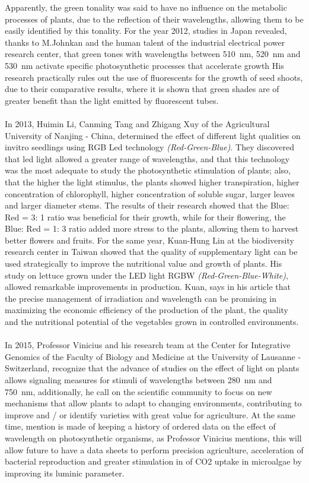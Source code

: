 \documentclass[letterpaper,12pt,twoside]{articleingud}
\begin{document}
Apparently, the green tonality was said to have no influence on the metabolic processes of plants, due to the reflection of their wavelengths, allowing them to be easily identified by this tonality. For the year 2012, studies in Japan revealed, thanks to M.Johnkan and the human talent of the industrial electrical power research center, that green tones with wavelengths between \SI{510}{\nano\metre}, \SI{520}{\nano\metre} and \SI{530}{\nano\metre} activate specific photosynthetic processes that accelerate growth His research practically rules out the use of fluorescents for the growth of seed shoots, due to their comparative results, where it is shown that green shades are of greater benefit than the light emitted by fluorescent tubes.\cite{Johkan}\\\\
In 2013, Huimin Li, Canming Tang and Zhigang Xuy of the Agricultural University of Nanjing - China, determined the effect of different light qualities on invitro seedlings using RGB Led technology \textit{(Red-Green-Blue)}. They discovered that led light allowed a greater range of wavelengths, and that this technology was the most adequate to study the photosynthetic stimulation of plants; also, that the higher the light stimulus, the plants showed higher transpiration, higher concentration of chlorophyll, higher concentration of soluble sugar, larger leaves and larger diameter stems. The results of their research showed that the Blue: Red = 3: 1 ratio was beneficial for their growth, while for their flowering, the Blue: Red = 1: 3 ratio added more stress to the plants, allowing them to harvest better flowers and fruits.\cite{Li}
For the same year, Kuan-Hung Lin at the biodiversity research center in Taiwan showed that the quality of supplementary light can be used strategically to improve the nutritional value and growth of plants. His study on lettuce grown under the LED light RGBW \textit{(Red-Green-Blue-White)}, allowed remarkable improvements in production. Kuan, says in his article that the precise management of irradiation and wavelength can be promising in maximizing the economic efficiency of the production of the plant, the quality and the nutritional potential of the vegetables grown in controlled environments.\cite{Kuan}\\\\
In 2015, Professor Vinicius and his research team at the Center for Integrative Genomics of the Faculty of Biology and Medicine at the University of Lausanne - Switzerland, recognize that the advance of studies on the effect of light on plants allows signaling measures for stimuli of wavelengths between \SI{280}{\nano\metre} and \SI{750}{\nano\metre}, additionally, he call on the scientific community to focus on new mechanisms that allow plants to adapt to changing environments, contributing to improve and / or identify varieties with great value for agriculture. At the same time, mention is made of keeping a history of ordered data on the effect of wavelength on photosynthetic organisms, as Professor Vinicius mentions, this will allow future to have a data sheets to perform precision agriculture, acceleration of bacterial reproduction and greater stimulation in of CO2 uptake in microalgae by improving its luminic parameter.\cite{Galva}
\end{document}
